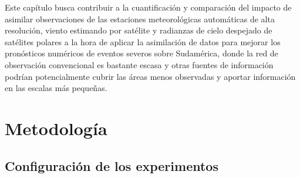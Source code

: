 \documentclass[12pt,oneside,a4paper]{reedthesis}
\begin{document}
Este capítulo busca contribuir a la cuantificación y comparación del impacto de asimilar observaciones de las estaciones meteorológicas automáticas de alta resolución, viento estimando por satélite y radianzas de cielo despejado de satélites polares a la hora de aplicar la asimilación de datos para mejorar los pronósticos numéricos de eventos severos sobre Sudamérica, donde la red de observación convencional es bastante escasa y otras fuentes de información podrían potencialmente cubrir las áreas menos observadas y aportar información en las escalas más pequeñas.

\hypertarget{metodologuxeda}{%
\section{Metodología}\label{metodologuxeda}}

\hypertarget{config}{%
\subsection{Configuración de los experimentos}\label{config}}
\end{document}
